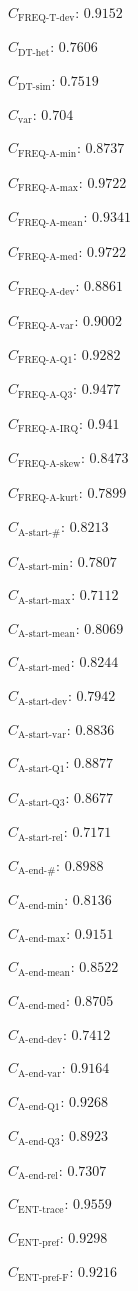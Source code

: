 \documentclass[a4paper]{article}
\newcommand{\varietyname}{\text{var}}
\newcommand{\variety}{C_{\varietyname}}
\newcommand{\startactivitiesname}{\text{A-start-\#}}
\newcommand{\startactivities}{C_{\startactivitiesname}}
\newcommand{\startactivitiesrelname}{\text{A-start-rel}}
\newcommand{\startactivitiesrel}{C_{\startactivitiesrelname}}
\newcommand{\startminname}{\text{A-start-min}}
\newcommand{\startmin}{C_{\startminname}}
\newcommand{\startmaxname}{\text{A-start-max}}
\newcommand{\startmax}{C_{\startmaxname}}
\newcommand{\startmeanname}{\text{A-start-mean}}
\newcommand{\startmean}{C_{\startmeanname}}
\newcommand{\startmedianname}{\text{A-start-med}}
\newcommand{\startmedian}{C_{\startmedianname}}
\newcommand{\startdevname}{\text{A-start-dev}}
\newcommand{\startdev}{C_{\startdevname}}
\newcommand{\startvarname}{\text{A-start-var}}
\newcommand{\startvar}{C_{\startvarname}}
\newcommand{\startqonename}{\text{A-start-Q1}}
\newcommand{\startqone}{C_{\startqonename}}
\newcommand{\startqthreename}{\text{A-start-Q3}}
\newcommand{\startqthree}{C_{\startqthreename}}
\newcommand{\lastactivitiesname}{\text{A-end-\#}}
\newcommand{\lastactivities}{C_{\lastactivitiesname}}
\newcommand{\lastactivitiesrelname}{\text{A-end-rel}}
\newcommand{\lastactivitiesrel}{C_{\lastactivitiesrelname}}
\newcommand{\lastminname}{\text{A-end-min}}
\newcommand{\lastmin}{C_{\lastminname}}
\newcommand{\lastmaxname}{\text{A-end-max}}
\newcommand{\lastmax}{C_{\lastmaxname}}
\newcommand{\lastmeanname}{\text{A-end-mean}}
\newcommand{\lastmean}{C_{\lastmeanname}}
\newcommand{\lastmedianname}{\text{A-end-med}}
\newcommand{\lastmedian}{C_{\lastmedianname}}
\newcommand{\lastdevname}{\text{A-end-dev}}
\newcommand{\lastdev}{C_{\lastdevname}}
\newcommand{\lastvarname}{\text{A-end-var}}
\newcommand{\lastvar}{C_{\lastvarname}}
\newcommand{\lastqonename}{\text{A-end-Q1}}
\newcommand{\lastqone}{C_{\lastqonename}}
\newcommand{\lastqthreename}{\text{A-end-Q3}}
\newcommand{\lastqthree}{C_{\lastqthreename}}
\newcommand{\freqdevname}{\text{FREQ-T-dev}}
\newcommand{\freqdev}{C_{\freqdevname}}
\newcommand{\actfreqminname}{\text{FREQ-A-min}}
\newcommand{\actfreqmin}{C_{\actfreqminname}}
\newcommand{\actfreqmaxname}{\text{FREQ-A-max}}
\newcommand{\actfreqmax}{C_{\actfreqmaxname}}
\newcommand{\actfreqmeanname}{\text{FREQ-A-mean}}
\newcommand{\actfreqmean}{C_{\actfreqmeanname}}
\newcommand{\actfreqmedianname}{\text{FREQ-A-med}}
\newcommand{\actfreqmedian}{C_{\actfreqmedianname}}
\newcommand{\actfreqdevname}{\text{FREQ-A-dev}}
\newcommand{\actfreqdev}{C_{\actfreqdevname}}
\newcommand{\actfreqvarname}{\text{FREQ-A-var}}
\newcommand{\actfreqvar}{C_{\actfreqvarname}}
\newcommand{\actfreqqonename}{\text{FREQ-A-Q1}}
\newcommand{\actfreqqone}{C_{\actfreqqonename}}
\newcommand{\actfreqqthreename}{\text{FREQ-A-Q3}}
\newcommand{\actfreqqthree}{C_{\actfreqqthreename}}
\newcommand{\actfreqiqrname}{\text{FREQ-A-IRQ}}
\newcommand{\actfreqiqr}{C_{\actfreqiqrname}}
\newcommand{\actfreqskewname}{\text{FREQ-A-skew}}
\newcommand{\actfreqskew}{C_{\actfreqskewname}}
\newcommand{\actfreqkurtname}{\text{FREQ-A-kurt}}
\newcommand{\actfreqkurt}{C_{\actfreqkurtname}}
\newcommand{\dthetname}{\text{DT-het}}
\newcommand{\dthet}{C_{\dthetname}}
\newcommand{\dtsimname}{\text{DT-sim}}
\newcommand{\dtsim}{C_{\dtsimname}}
\newcommand{\enttracename}{\text{ENT-trace}}
\newcommand{\enttrace}{C_{\enttracename}}
\newcommand{\entprefixname}{\text{ENT-pref}}
\newcommand{\entprefix}{C_{\entprefixname}}
\newcommand{\entprefixflatname}{\text{ENT-pref-F}}
\newcommand{\entprefixflat}{C_{\entprefixflatname}}
\begin{document}
\begin{compactitem}
\item $\freqdev$: $0.9152$
\item $\dthet$: $0.7606$
\item $\dtsim$: $0.7519$
\item $\variety$: $0.704$
\item $\actfreqmin$: $0.8737$
\item $\actfreqmax$: $0.9722$
\item $\actfreqmean$: $0.9341$
\item $\actfreqmedian$: $0.9722$
\item $\actfreqdev$: $0.8861$
\item $\actfreqvar$: $0.9002$
\item $\actfreqqone$: $0.9282$
\item $\actfreqqthree$: $0.9477$
\item $\actfreqiqr$: $0.941$
\item $\actfreqskew$: $0.8473$
\item $\actfreqkurt$: $0.7899$
\item $\startactivities$: $0.8213$
\item $\startmin$: $0.7807$
\item $\startmax$: $0.7112$
\item $\startmean$: $0.8069$
\item $\startmedian$: $0.8244$
\item $\startdev$: $0.7942$
\item $\startvar$: $0.8836$
\item $\startqone$: $0.8877$
\item $\startqthree$: $0.8677$
\item $\startactivitiesrel$: $0.7171$
\item $\lastactivities$: $0.8988$
\item $\lastmin$: $0.8136$
\item $\lastmax$: $0.9151$
\item $\lastmean$: $0.8522$
\item $\lastmedian$: $0.8705$
\item $\lastdev$: $0.7412$
\item $\lastvar$: $0.9164$
\item $\lastqone$: $0.9268$
\item $\lastqthree$: $0.8923$
\item $\lastactivitiesrel$: $0.7307$
\item $\enttrace$: $0.9559$
\item $\entprefix$: $0.9298$
\item $\entprefixflat$: $0.9216$

\end{compactitem}
\end{document}
